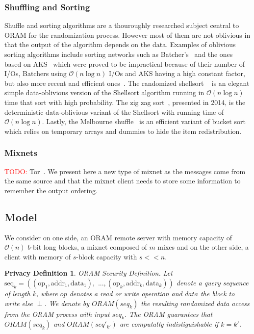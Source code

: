 \documentclass[english,oneside,twocolumn]{article}
\newtheorem{privdef}{Privacy Definition}
\newcommand{\todo}[1]{\textcolor{red}{TODO: #1}}
\begin{document}
\subsubsection{Shuffling and Sorting}
Shuffle and sorting algorithms are a thouroughly researched subject central to ORAM for the randomization process. However most of them are not oblivious in that the output of the algorithm depends on the data.
Examples of oblivious sorting algorithms include sorting networks such as Batcher's~\cite{batcher1968sorting} and the ones based on AKS~\cite{ajtai19830} which were proved to be impractical because of their number of I/Os, Batchers using $\mathcal{O}\left ( n \log n \right)$ I/Os and AKS having a high constant factor, but also more recent and efficient ones~\cite{paterson1990improved}.
The randomized shellsort ~\cite{goodrich2010randomized} is an elegant simple data-oblivious version of the Shellsort algorithm running in $\mathcal{O}\left ( n \log n \right)$ time that sort with high probability.
The zig zag sort~\cite{goodrich2014zig}, presented in 2014, is the deterministic data-oblivious variant of the Shellsort with running time of $\mathcal{O}\left ( n \log n\right)$.
Lastly, the Melbourne shuffle~\cite{ohrimenko2014melbourne} is an efficient variant of bucket sort which relies on temporary arrays and dummies to hide the item redistribution.

\subsubsection{Mixnets}
\todo{} Tor~\cite{dingledine2004tor}. 
We present here a new type of mixnet as the messages come from the same source and that the mixnet client needs to store some information to remember the output ordering.

\subsection{Model}
We consider on one side, an ORAM remote server with memory capacity of $\mathcal{O}\left(n\right)$ $b$-bit long blocks, a mixnet composed of $m$ mixes and on the other side, a client with memory of $s$-block capacity with $s<<n$.

\begin{privdef}{ORAM Security Definition.}
Let $\text{seq}_k=((\text{op}_1, \text{addr}_1, \text{data}_1), \text{ ...},(\text{op}_k, \text{addr}_k, \text{data}_k))$ denote a query sequence of length $k$, where $op$ denotes a read or write operation and $data$ the block to write else $
\perp$.
We denote by $ORAM(seq_k)$ the resulting randomized data access from the ORAM process with input $seq_k$.
The ORAM guarantees that $ORAM(seq_k)$ and $ORAM(seq'_{k'})$ are computally indistiguishable if $k=k'$.
\end{privdef}
\end{document}

